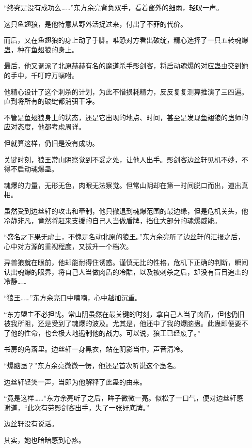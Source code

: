 
\begin{this_body}

“终究是没有成功么……”东方余亮背负双手，看着窗外的细雨，轻叹一声。

这只鱼翅狼，是他特意从野外活捉过来，付出了不菲的代价。

而后，又在鱼翅狼的身上动了手脚。唯恐对方看出破绽，精心选择了一只五转魂爆蛊，种在鱼翅狼的身上。

最后，他又调派了北原赫赫有名的魔道杀手影剑客，将启动魂爆的对应蛊虫交到她的手中，千叮咛万嘱咐。

他精心设计了这个刺杀的计划，为此不惜损耗精力，反反复复测算推演了三四遍。直到将所有的破绽都消弭干净。

不管是鱼翅狼身上的状态，还是它出现的地点、时间，甚至是发现鱼翅狼的蛊师的应对态度，他都考虑周详。

但就算这样，仍旧是没有成功。

关键时刻，狼王常山阴察觉到不妥之处，让他人出手。影剑客边丝轩见机不妙，不得不启动魂爆蛊。

魂爆的力量，无形无色，肉眼无法察觉。但常山阴却在第一时间脱口而出，道出真相。

虽然受到边丝轩的攻击和牵制，他只撤退到魂爆范围的最边缘，但是危机关头，他冷静非凡，竟然将赶来支援的自己人当做盾牌，挡住大部分的魂爆威能。

“盛名之下果无虚士，不愧是名动北原的狼王。”东方余亮听了边丝轩的汇报之后，心中对方源的重视程度，又拔升一个档次。

异兽狼就在眼前，他却能耐得住诱惑。谨慎无比的性格，危机下正确的判断，瞬间认出魂爆的眼界，将自己人当做肉盾的冷酷，以及被刺杀之后，却没有盲目追击的冷静……

“狼王……”东方余亮口中喃喃，心中越加沉重。

“东方盟主不必担忧。常山阴虽然在最关键的时刻，拿自己人当了肉盾，但他仍旧被我所阻，还是受到了魂爆的波及。尤其是，他还中了我的爆脑蛊。此蛊即便要不了他的性命，也会极大地遏制他的战力。可以说，狼王已经废了。”

书房的角落里。边丝轩一身黑衣，站在阴影当中，声音清冷。

“爆脑蛊？”东方余亮微微一愣，他还是首次听说这个蛊名。

边丝轩轻笑一声，当即为他解释了此蛊的由来。

“竟是这样……”东方余亮听了之后，眸子微微一亮。似松了一口气，便对边丝轩感谢道，“此次有劳影剑客出手，失了一张好底牌。”

边丝轩没有说话。

其实，她也暗暗感到心疼。


\end{this_body}
